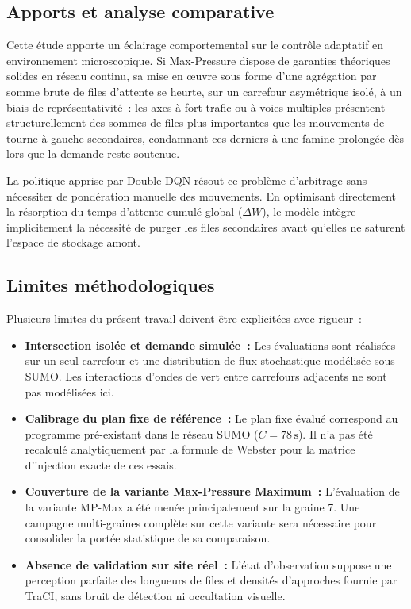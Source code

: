 \documentclass[11pt,a4paper]{article}
\begin{document}
\subsection{Apports et analyse comparative}
Cette étude apporte un éclairage comportemental sur le contrôle adaptatif en environnement microscopique. Si Max-Pressure dispose de garanties théoriques solides en réseau continu, sa mise en œuvre sous forme d'une agrégation par somme brute de files d'attente se heurte, sur un carrefour asymétrique isolé, à un biais de représentativité~: les axes à fort trafic ou à voies multiples présentent structurellement des sommes de files plus importantes que les mouvements de tourne-à-gauche secondaires, condamnant ces derniers à une famine prolongée dès lors que la demande reste soutenue.

La politique apprise par Double DQN résout ce problème d'arbitrage sans nécessiter de pondération manuelle des mouvements. En optimisant directement la résorption du temps d'attente cumulé global ($\Delta W$), le modèle intègre implicitement la nécessité de purger les files secondaires avant qu'elles ne saturent l'espace de stockage amont.

\subsection{Limites méthodologiques}
Plusieurs limites du présent travail doivent être explicitées avec rigueur~:
\begin{itemize}[nosep]
    \item \textbf{Intersection isolée et demande simulée~:} Les évaluations sont réalisées sur un seul carrefour et une distribution de flux stochastique modélisée sous SUMO. Les interactions d'ondes de vert entre carrefours adjacents ne sont pas modélisées ici.
    \item \textbf{Calibrage du plan fixe de référence~:} Le plan fixe évalué correspond au programme pré-existant dans le réseau SUMO ($C = 78\,\mathrm{s}$). Il n'a pas été recalculé analytiquement par la formule de Webster pour la matrice d'injection exacte de ces essais.
    \item \textbf{Couverture de la variante Max-Pressure Maximum~:} L'évaluation de la variante MP-Max a été menée principalement sur la graine 7. Une campagne multi-graines complète sur cette variante sera nécessaire pour consolider la portée statistique de sa comparaison.
    \item \textbf{Absence de validation sur site réel~:} L'état d'observation suppose une perception parfaite des longueurs de files et densités d'approches fournie par TraCI, sans bruit de détection ni occultation visuelle.
\end{itemize}
\end{document}
